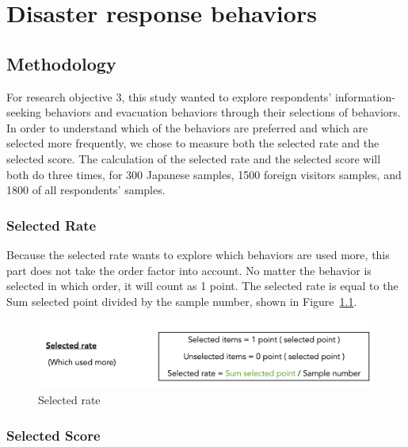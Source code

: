


\chapter{Disaster response behaviors}
\label{c6}

\section{Methodology}

For research objective 3, this study wanted to explore respondents' information-seeking behaviors and evacuation behaviors through their selections of behaviors. In order to understand which of the behaviors are preferred and which are selected more frequently, we chose to measure both the selected rate and the selected score. The calculation of the selected rate and the selected score will both do three times, for 300 Japanese samples, 1500 foreign visitors samples, and 1800 of all respondents' samples.

\subsection{Selected Rate}
Because the selected rate wants to explore which behaviors are used more, this part does not take the order factor into account. No matter the behavior is selected in which order, it will count as 1 point. The selected rate is equal to the Sum selected point divided by the sample number, shown in Figure~\ref{fig10}.

\begin{figure}[h]
  \includegraphics[width=\linewidth]{Figure/Figure10.png}
  \centering
  \caption{Selected rate }
  \label{fig10}
\end{figure}

\subsection{Selected Score}


